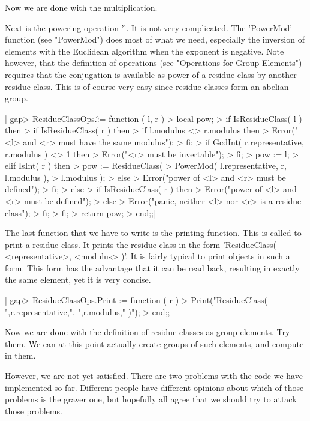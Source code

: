 Now we are done with the multiplication.

Next is the  powering operation '\^'.  It is not very  complicated.   The
'PowerMod'  function  (see  "PowerMod")  does   most  of  what  we  need,
especially the  inversion of elements with  the Euclidean  algorithm when
the  exponent  is   negative.   Note  however,  that  the  definition  of
operations (see  "Operations  for  Group  Elements")  requires  that  the
conjugation  is  available as power of a residue class by another residue
class.  This is of course very easy since residue classes form an abelian
group.

|    gap> ResidueClassOps.\^ := function ( l, r )
    >     local    pow;
    >     if IsResidueClass( l )  then
    >         if IsResidueClass( r )  then
    >             if l.modulus <> r.modulus  then
    >                 Error("<l> and <r> must have the same modulus");
    >             fi;
    >             if GcdInt( r.representative, r.modulus ) <> 1  then
    >                 Error("<r> must be invertable");
    >             fi;
    >             pow := l;
    >         elif IsInt( r )  then
    >             pow := ResidueClass(
    >                         PowerMod( l.representative, r, l.modulus ),
    >                         l.modulus );
    >         else
    >             Error("power of <l> and <r> must be defined");
    >         fi;
    >     else
    >         if IsResidueClass( r )  then
    >             Error("power of <l> and <r> must be defined");
    >         else
    >             Error("panic, neither <l> nor <r> is a residue class");
    >         fi;
    >     fi;
    >     return pow;
    > end;;|

The last function that we  have to write is  the printing function.  This
is called  to print a residue class.   It prints the residue class in the
form 'ResidueClass( <representative>, <modulus> )'.  It is fairly typical
to print objects in such a form.  This form has the advantage that it can
be read back,  resulting in exactly  the  same  element, yet  it is  very
concise.

|    gap> ResidueClassOps.Print := function ( r )
    >     Print("ResidueClass( ",r.representative,", ",r.modulus," )");
    > end;;|

Now we are done with the definition of residue classes as group elements.
Try them.  We can at this point actually create  groups of such elements,
and compute in them.

However, we are not yet satisfied.  There  are two problems with the code
we  have implemented  so far.  Different   people have different opinions
about which of those problems is the graver one,  but hopefully all agree
that we should try to attack those problems.

